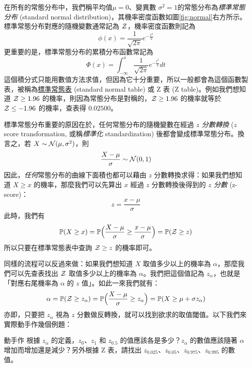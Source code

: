     \medskip

    在所有的常態分布中，我們稱平均值$\mu =0$、變異數 $\sigma^2 = 1$的常態分布為\textit{標準常態分布} (standard normal distribution)，其機率密度函數如圖\ref{fig:normal}右方所示。標準常態分布對應的隨機變數通常記為 $\mathcal{Z}$，機率密度函數則記為
    \smallskip
    \[\phi(x)=\frac{1}{\sqrt{2\pi}}e^{-\frac{x^2}{2}}\]
    \smallskip
    更重要的是，標準常態分布的累積分布函數常記為
    \smallskip
    \[\Phi(x)=\int_{-\infty}^x \frac{1}{\sqrt{2\pi}}e^{-\frac{t^2}{2}} dt\]
    \smallskip
    這個積分式只能用數值方法求值，但因為它十分重要，所以一般都會為這個函數製表，被稱為\href{https://en.wikipedia.org/wiki/Standard_normal_table}{標準常態表} (standard normal table) 或 Z 表 (Z table)。例如我們想知道 $\mathcal{Z} \ge 1.96$ 的機率，則因為常態分布是對稱的，$\mathcal{Z} \ge 1.96$ 的機率就等於 $\mathcal{Z} \le -1.96$ 的機率，查表得 $0.02500$。

    \medskip
    
    標準常態分布重要的原因在於，任何常態分布的隨機變數在經過 \textit{$z$ 分數轉換} ($z$ score transformation, 或稱\textit{標準化} standardization) 後都會變成標準常態分布。換言之，若 $X \sim \mathcal{N}(\mu, \sigma^2)$，則
    \smallskip
    \[\frac{X-\mu}{\sigma} \sim \mathcal{N}(0,1)\]
    \smallskip
    因此，\textit{任何}常態分布的曲線下面積也都可以藉由 $z$ 分數轉換求得：如果我們想知道 $X \ge x$ 的機率，那麼我們可以先算出 $x$ 經過 $z$ 分數轉換後得到的 \textit{$z$ 分數} (z-score)：
    \smallskip
    \[z = \frac{x-\mu}{\sigma}\]
    \smallskip
    此時，我們有
    \smallskip
    \[\mathbb{P}(X \ge x) = \mathbb{P}\Big(\frac{X-\mu}{\sigma} \ge \frac{x-\mu}{\sigma}\Big) = \mathbb{P}(\mathcal{Z} \ge z)\]
    \smallskip
    所以只要在標準常態表中查詢 $\mathcal{Z} \ge z$ 的機率即可。
    
    同樣的流程可以反過來做：如果我們想知道 $X$ 取值多少以上的機率為 $\alpha$，那麼我們可以先查表找出 $\mathcal{Z}$ 取值多少以上的機率為 $\alpha$。我們把這個值記為 $z_\alpha$，也就是「對應右尾機率為 $\alpha$ 的 $z$ 值」。如此一來我們就有：
    \smallskip
    \[\alpha = \mathbb{P}(\mathcal{Z} \ge z_\alpha) = \mathbb{P}\Big(\frac{X-\mu}{\sigma} \ge z_\alpha \Big) = \mathbb{P}(X \ge \mu + \sigma z_\alpha)\]
    \smallskip
    亦即，只要把 $z_\alpha$ 視為 $z$ 分數做反轉換，就可以找到欲求的取值閾值。以下我們來實際動手作幾個例題：

    \medskip

    \begin{custom}{動手作}
        根據 $z_\alpha$ 的定義，$z_{0}$、$z_{1}$ 和 $z_{0.5}$ 的值應該各是多少？$z_\alpha$ 的數值應該隨著 $\alpha$ 增加而增加還是減少？另外根據 Z 表，請找出 $z_{0.025}$、$z_{0.05}$、$z_{0.975}$、$z_{0.995}$ 的數值。
    \end{custom}
    
